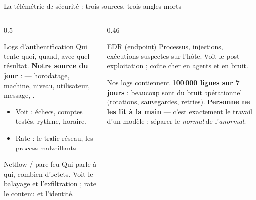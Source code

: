\begin{frame}{La télémétrie de sécurité : trois sources, trois angles morts}
\begin{columns}[t]
\begin{column}{0.5\textwidth}
\begin{block}{Logs d'authentification}
Qui tente quoi, quand, avec quel résultat. \textbf{Notre source du jour} :
 --- horodatage, machine, niveau, utilisateur, message,
.
\begin{itemize}
\item Voit : échecs, comptes testés, rythme, horaire.
\item Rate : le trafic réseau, les process malveillants.
\end{itemize}
\end{block}
\begin{block}{Netflow / pare-feu}
Qui parle à qui, combien d'octets. Voit le balayage et l'exfiltration ;
rate le contenu et l'identité.
\end{block}
\end{column}
\begin{column}{0.46\textwidth}
\begin{block}{EDR (endpoint)}
Processus, injections, exécutions suspectes sur l'hôte. Voit le post-exploitation ;
 coûte cher en agents et en bruit.
\end{block}
\begin{wbox}
Nos logs contiennent \textbf{100\,000 lignes sur 7 jours} : beaucoup sont du
bruit opérationnel (rotations, sauvegardes, retries). \textbf{Personne ne les
lit à la main} --- c'est exactement le travail d'un modèle : séparer le
\emph{normal} de l'\emph{anormal}.
\end{wbox}
\end{column}
\end{columns}
\end{frame}

